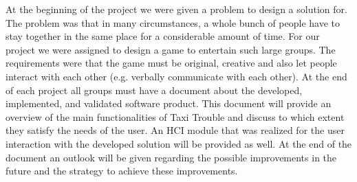 At the beginning of the project we were given a problem to design a solution for. The problem was that in many
circumstances, a whole bunch of people have to stay together in the same place for a considerable amount of
time. For our project we were assigned to design a game to entertain such large groups. The requirements were
that the game must be original, creative and also let people interact with each other (e.g. verbally communicate
with each other).
At the end of each project all groups must have a document about the developed, implemented, and validated
software product. This document will provide an overview of the main functionalities of Taxi Trouble and discuss
to which extent they satisfy the needs of the user. An HCI module that was realized for the user interaction with
the developed solution will be provided as well. At the end of the document an outlook will be given regarding
the possible improvements in the future and the strategy to achieve these improvements.